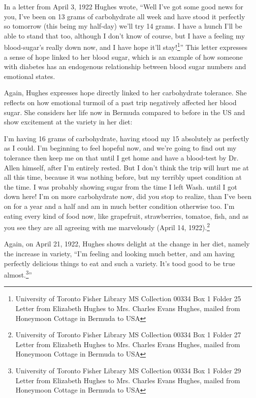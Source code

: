 \documentclass[12pt]{article}
\begin{document}
In a letter from April 3, 1922 Hughes wrote, ``Well I've got some good news for you, I've been on 13 grams of carbohydrate all week and have stood it perfectly so tomorrow (this being my half-day) we'll try 14 grams. I have a hunch I'll be able to stand that too, although I don't know of course, but I have a feeling my blood-sugar's really down now, and I have hope it'll stay!\footnote{University of Toronto Fisher Library MS Collection 00334 Box 1 Folder 25 Letter from Elizabeth Hughes to Mrs. Charles Evans Hughes, mailed from Honeymoon Cottage in Bermuda to USA}'' This letter expresses a sense of hope linked to her blood sugar, which is an example of how someone with diabetes has an endogenous relationship between blood sugar numbers and emotional states.   


Again, Hughes expresses hope directly linked to her carbohydrate tolerance. She reflects on how emotional turmoil of a past trip negatively affected her blood sugar. She considers her life now in Bermuda compared to before in the US and show excitement at the variety in her diet:
\begin{singlespace}
I'm having 16 grams of carbohydrate, having stood my 15 absolutely as perfectly as I could. I'm beginning to feel hopeful now, and we're going to find out my tolerance then keep me on that until I get home and have a blood-test by Dr. Allen himself, after I'm entirely rested. But I don't think the trip will hurt me at all this time, because it was nothing before, but my terribly upset condition at the time. I was probably showing sugar from the time I left Wash. until I got down here! I'm on more carbohydrate now, did you stop to realize, than I've been on for a year and a half and am in much better condition otherwise too. I'm eating every kind of food now, like grapefruit, strawberries, tomatoe, fish, and as you see they are all agreeing with me marvelously (April 14, 1922).\footnote{University of Toronto Fisher Library MS Collection 00334 Box 1 Folder 27 Letter from Elizabeth Hughes to Mrs. Charles Evans Hughes, mailed from Honeymoon Cottage in Bermuda to USA}
\end{singlespace}

Again, on April 21, 1922, Hughes shows delight at the change in her diet, namely the increase in variety, ``I'm feeling and looking much better, and am having perfectly delicious things to eat and such a variety. It's tood good to be true almost.\footnote{University of Toronto Fisher Library MS Collection 00334 Box 1 Folder 29 Letter from Elizabeth Hughes to Mrs. Charles Evans Hughes, mailed from Honeymoon Cottage in Bermuda to USA}''
\end{document}
